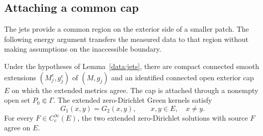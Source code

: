\subsection{Attaching a common cap}

The jets provide a common region on the exterior side of a smaller
patch. The following energy argument transfers the measured data to
that region without making assumptions on the inaccessible boundary.

\begin{proposition}\label{data:cap}
Under the hypotheses of Lemma~\ref{data:jets}, there are compact
connected smooth extensions $(M_j^e,g_j^e)$ of $(M,g_j)$ and an
identified connected open exterior cap $E$ on which the extended
metrics agree. The cap is attached through a nonempty open set
$P_0\Subset\Gamma$. The extended zero-Dirichlet Green kernels satisfy
\[
 G_1(x,y)=G_2(x,y),\qquad x,y\in E,\quad x\ne y.
\]
For every $F\in C_c^\infty(E)$, the two extended zero-Dirichlet
solutions with source $F$ agree on $E$.
\end{proposition}

